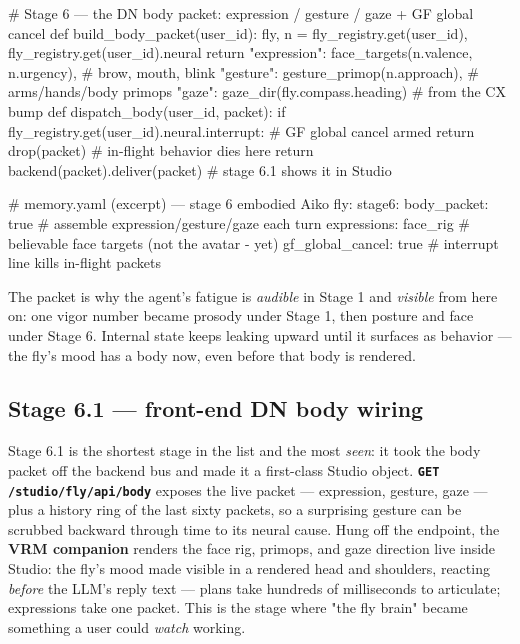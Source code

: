 \documentclass[11pt]{article}
\begin{document}
\begin{CodeBlock}
# Stage 6 — the DN body packet: expression / gesture / gaze + GF global cancel
def build_body_packet(user_id):
    fly, n = fly_registry.get(user_id), fly_registry.get(user_id).neural
    return {"expression": face_targets(n.valence, n.urgency),  # brow, mouth, blink
            "gesture": gesture_primop(n.approach),             # arms/hands/body primops
            "gaze": gaze_dir(fly.compass.heading)}             # from the CX bump
def dispatch_body(user_id, packet):
    if fly_registry.get(user_id).neural.interrupt:   # GF global cancel armed
        return drop(packet)                          # in-flight behavior dies here
    return backend(packet).deliver(packet)           # stage 6.1 shows it in Studio
\end{CodeBlock}

\begin{CodeBlock}
# memory.yaml (excerpt) — stage 6 embodied Aiko
fly:
  stage6:
    body_packet: true            # assemble expression/gesture/gaze each turn
    expressions: face_rig        # believable face targets (not the avatar - yet)
    gf_global_cancel: true       # interrupt line kills in-flight packets
\end{CodeBlock}

The packet is why the agent's fatigue is \emph{audible} in Stage 1 and \emph{visible} from here on: one vigor number became prosody under Stage 1, then posture and face under Stage 6. Internal state keeps leaking upward until it surfaces as behavior — the fly's mood has a body now, even before that body is rendered.

\subsection{Stage 6.1 — front-end DN body wiring}

Stage 6.1 is the shortest stage in the list and the most \emph{seen}: it took the body packet off the backend bus and made it a first-class Studio object. \textbf{\texttt{GET /studio/fly/api/body}} exposes the live packet — expression, gesture, gaze — plus a history ring of the last sixty packets, so a surprising gesture can be scrubbed backward through time to its neural cause. Hung off the endpoint, the \textbf{VRM companion} renders the face rig, primops, and gaze direction live inside Studio: the fly's mood made visible in a rendered head and shoulders, reacting \emph{before} the LLM's reply text — plans take hundreds of milliseconds to articulate; expressions take one packet. This is the stage where "the fly brain" became something a user could \emph{watch} working.
\end{document}
